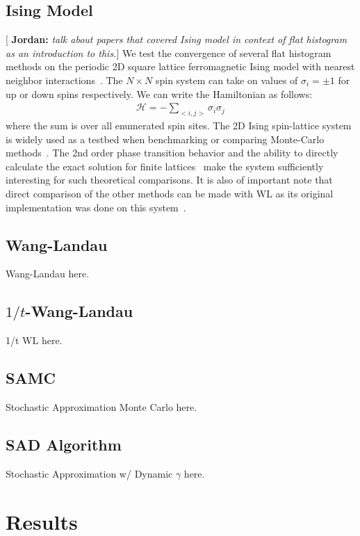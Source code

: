 \documentclass[letterpaper,twocolumn,amsmath,amssymb,pre,aps,10pt]{revtex4-1}
\newcommand{\blue}[1]{{\bf \color{blue} #1}}
\newcommand{\jpsays}[1]{{\color{red} [\blue{Jordan:} \emph{#1}]}}
\begin{document}
\subsection{Ising Model}
\jpsays{talk about papers that covered Ising model in context of flat histogram
as an introduction to this.}
We test the convergence of several flat histogram methods
on the periodic 2D square lattice ferromagnetic Ising model with nearest
neighbor interactions~\cite{landau2004new}. The $N\times N$ spin system can
take on values of $\sigma_i = \pm 1$ for up or down spins respectively. We
can write the Hamiltonian as follows:
\begin{align}
\mathcal{H} = -\sum_{<i,j>} \sigma_i \sigma_j
\end{align}
where the sum is over all enumerated spin sites. The 2D Ising spin-lattice
system is widely used as a testbed when benchmarking or comparing Monte-Carlo
methods~\cite{ferdinand1969bounded, wang1999transition}. The
2nd order phase transition behavior and the ability to directly calculate the
exact solution for finite lattices~\cite{beale1996exact} make the system sufficiently
interesting for such theoretical comparisons. It is also of important note that
direct comparison of the other methods can be made with WL as its original implementation
was done on this system~\cite{wang2001determining,wang2001efficient}.

\subsection{Wang-Landau}
Wang-Landau here.

\subsection{$1/t$-Wang-Landau}
1/t WL here.

\subsection{SAMC}
Stochastic Approximation Monte Carlo here.

\subsection{SAD Algorithm}\label{sec:sad}
Stochastic Approximation w/ Dynamic $\gamma$ here.

\section{Results}
\end{document}

